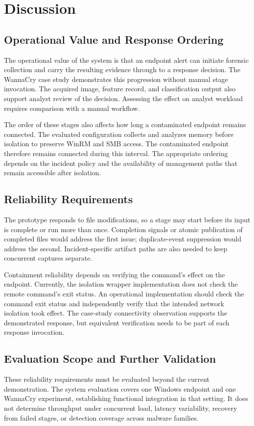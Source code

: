\documentclass[conference]{IEEEtran}
\begin{document}
\section{Discussion}
\label{sec:discussion}

\subsection{Operational Value and Response Ordering}
The operational value of the system is that an endpoint alert can initiate forensic collection and carry the resulting evidence through to a response decision. The WannaCry case study demonstrates this progression without manual stage invocation. The acquired image, feature record, and classification output also support analyst review of the decision. Assessing the effect on analyst workload requires comparison with a manual workflow.

The order of these stages also affects how long a contaminated endpoint remains connected. The evaluated configuration collects and analyzes memory before isolation to preserve WinRM and SMB access. The contaminated endpoint therefore remains connected during this interval. The appropriate ordering depends on the incident policy and the availability of management paths that remain accessible after isolation.

\subsection{Reliability Requirements}
The prototype responds to file modifications, so a stage may start before its input is complete or run more than once. Completion signals or atomic publication of completed files would address the first issue; duplicate-event suppression would address the second. Incident-specific artifact paths are also needed to keep concurrent captures separate.

Containment reliability depends on verifying the command's effect on the endpoint. Currently, the isolation wrapper implementation does not check the remote command's exit status. An operational implementation should check the command exit status and independently verify that the intended network isolation took effect. The case-study connectivity observation supports the demonstrated response, but equivalent verification needs to be part of each response invocation.

\subsection{Evaluation Scope and Further Validation}
These reliability requirements must be evaluated beyond the current demonstration. The system evaluation covers one Windows endpoint and one WannaCry experiment, establishing functional integration in that setting. It does not determine throughput under concurrent load, latency variability, recovery from failed stages, or detection coverage across malware families.
\end{document}
